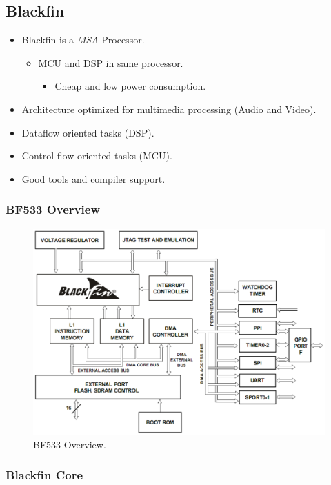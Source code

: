 \subsection{Blackfin}
\begin{itemize}
	\item Blackfin is a \textit{MSA} Processor.
	\begin{itemize}
		\item MCU and DSP in same processor.
		\begin{itemize}
			\item Cheap and low power consumption.
		\end{itemize}
	\end{itemize}
	\item Architecture optimized for multimedia	processing (Audio and Video).
	\item Dataflow oriented tasks (DSP).
	\item Control flow oriented tasks (MCU).
	\item Good tools and compiler support.
\end{itemize}

\subsubsection{BF533 Overview}
\begin{figure} [H]
	\centering
	\includegraphics[width=0.85\linewidth]{graphics/6.png}
	\caption{BF533 Overview.}
	\label{fig:6}
\end{figure}

\subsubsection{Blackfin Core}

